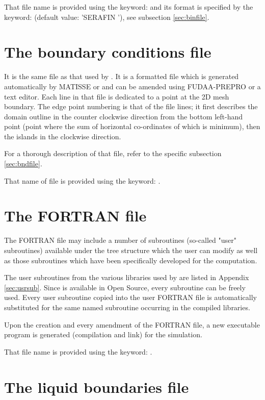 That file name is provided using the keyword:  and its
format is specified by the keyword:  (default
value: 'SERAFIN '), see subsection \ref{sec:binfile}.


\section{The boundary conditions file}

It is the same file as that used by . It is a formatted file which is
generated automatically by MATISSE or \stbtel and can be amended
using FUDAA-PREPRO or a text editor. Each line in that file is
dedicated to a point at the 2D mesh boundary. The edge point numbering is that
of the file lines; it first describes the domain outline in the counter
clockwise direction from the bottom left-hand point (point where the sum of
horizontal co-ordinates of which is minimum), then the islands in the clockwise
direction.

For a thorough description of that file, refer to the specific subsection
\ref{sec:bndfile}.

That name of file is provided using the keyword: .


\section{The FORTRAN file}

The FORTRAN file may include a number of subroutines (so-called "user"
subroutines) available under the  tree structure which the user can
modify as well as those subroutines which have been specifically developed for
the computation.

The user subroutines from the various libraries used by  are listed
in Appendix \ref{sec:usrsub}. Since  is available in Open Source, every
subroutine can be freely used. Every user subroutine copied into the user
FORTRAN file is automatically substituted for the same named subroutine
occurring in the  compiled libraries.

Upon the creation and every amendment of the FORTRAN file, a new executable
program is generated (compilation and link) for the simulation.

That file name is provided using the keyword: .


\section{The liquid boundaries file}

